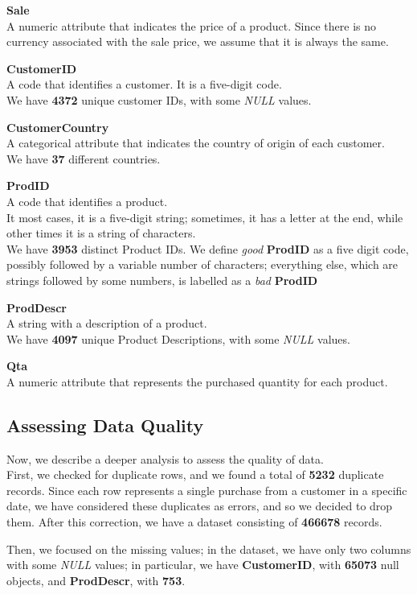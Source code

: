 \textbf{Sale}\\
A numeric attribute that indicates the price of a product.
Since there is no currency associated with the sale price, we assume that it is always the same.

\textbf{CustomerID}\\
A code that identifies a customer. It is a five-digit code.\\
We have \textbf{4372} unique customer IDs, with some \emph{NULL} values.

\textbf{CustomerCountry}\\
A categorical attribute that indicates the country of origin of each customer.\\
We have \textbf{37} different countries.

\textbf{ProdID}\\
A code that identifies a product.\\
It most cases, it is a five-digit string; sometimes, it has a letter at the end, while other times it is a string of characters.\\
We have \textbf{3953} distinct Product IDs.
We define \emph{good} \textbf{ProdID} as a five digit code, possibly followed by a variable number of characters; everything else, which are strings followed by some numbers, is labelled as a \emph{bad} \textbf{ProdID}

\textbf{ProdDescr}\\  
A string with a description of a product.\\
We have \textbf{4097} unique Product Descriptions, with some \emph{NULL} values.

\textbf{Qta}\\
A numeric attribute that represents the purchased quantity for each product.

\subsection{Assessing Data Quality}
Now, we describe a deeper analysis to assess the quality of data.\\
First, we checked for duplicate rows, and we found a total of \textbf{5232} duplicate records. Since each row represents a single purchase from a customer in a specific date, we have considered these duplicates as errors, and so we decided to drop them. After this correction, we have a dataset consisting of \textbf{466678} records.

Then, we focused on the missing values; in the dataset, we have only two columns with some \emph{NULL} values; in particular, we have \textbf{CustomerID}, with \textbf{65073} null objects, and \textbf{ProdDescr}, with \textbf{753}.

